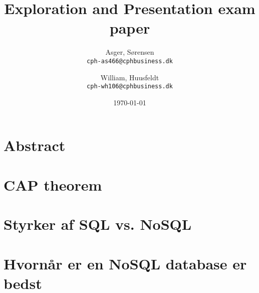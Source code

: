 \documentclass[10pt]{report}
\title{Exploration and Presentation exam paper}
\author{
    Asger, Sørensen\\
    \texttt{cph-as466@cphbusiness.dk}\\
    \and
    William, Huusfeldt\\
    \texttt{cph-wh106@cphbusiness.dk}\\
  }
\date{\today}
\begin{document}
\hypersetup{pageanchor=false}
\begin{titlepage}
\maketitle
\newpage
\tableofcontents
\newpage
\chapter{Abstract}

\chapter{CAP theorem}

\chapter{Styrker af SQL vs. NoSQL}

\chapter{Hvornår er en NoSQL database er bedst}

\end{titlepage}
\end{document}

